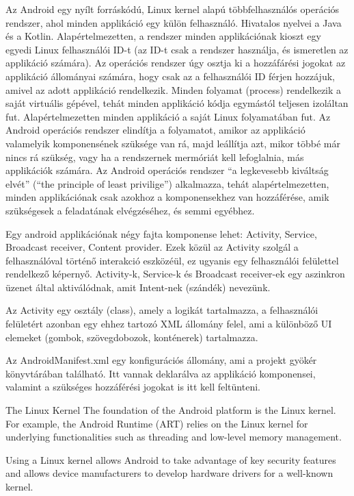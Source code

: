 Az Android egy nyílt forráskódú, Linux kernel alapú többfelhasználós operációs rendszer, ahol minden applikáció egy külön felhasználó. Hivatalos nyelvei a Java és a Kotlin. Alapértelmezetten, a rendszer minden applikációnak kioszt egy egyedi Linux felhasználói ID-t (az ID-t csak a rendszer használja, és ismeretlen az applikáció számára). Az operációs rendszer úgy osztja ki a hozzáfárési jogokat az applikáció állományai számára, hogy csak az a felhasználói ID férjen hozzájuk, amivel az adott applikáció rendelkezik. Minden folyamat (process) rendelkezik a saját virtuális gépével, tehát minden applikáció kódja egymástól teljesen izoláltan fut. Alapértelmezetten minden applikáció a saját Linux folyamatában fut. Az Android operációs rendszer elindítja a folyamatot, amikor az applikáció valamelyik komponensének szüksége van rá, majd leállítja azt, mikor többé már nincs rá szükség, vagy ha a rendszernek mermóriát kell lefoglalnia, más applikációk számára. Az Android operációs rendszer “a legkevesebb kiváltság elvét” (“the principle of least privilige”) alkalmazza, tehát alapértelmezetten, minden applikációnak csak azokhoz a komponensekhez van hozzáférése, amik szükségesek a feladatának elvégzéséhez, és semmi egyébhez.

Egy android applikációnak négy fajta komponense lehet: Activity, Service, Broadcast receiver, Content provider. Ezek közül az Activity szolgál a felhasználóval történő interakció eszközéül, ez ugyanis egy felhasználói felülettel rendelkező képernyő. Activity-k, Service-k és Broadcast receiver-ek egy aszinkron üzenet által aktiválódnak, amit Intent-nek (szándék) nevezünk.

Az Activity egy osztály (class), amely a logikát tartalmazza, a felhasználói felületért azonban egy ehhez tartozó XML állomány felel, ami a különböző UI elemeket (gombok, szövegdobozok, konténerek) tartalmazza.

Az AndroidManifest.xml egy konfigurációs állomány, ami a projekt gyökér könyvtárában található. Itt vannak deklarálva az applikáció komponensei, valamint a szükséges hozzáférési jogokat is itt kell feltünteni.



The Linux Kernel
The foundation of the Android platform is the Linux kernel. For example, the Android Runtime (ART) relies on the Linux kernel for underlying functionalities such as threading and low-level memory management.

Using a Linux kernel allows Android to take advantage of key security features and allows device manufacturers to develop hardware drivers for a well-known kernel.

